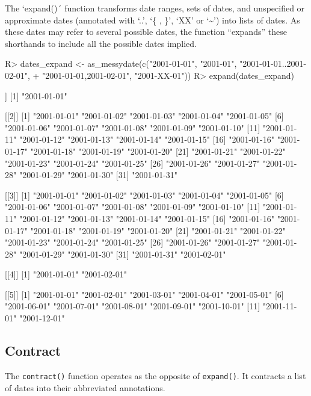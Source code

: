 \documentclass[
]{jss}
\begin{document}
The `expand()´ function transforms date ranges, sets of dates, and
unspecified or approximate dates (annotated with `..', `\{ , \}', `XX'
or `\textasciitilde{}') into lists of dates. As these dates may refer to
several possible dates, the function ``expands'' these shorthands to
include all the possible dates implied.

\begin{CodeChunk}
\begin{CodeInput}
R> dates_expand <- as_messydate(c("2001-01-01", "2001-01", "2001-01-01..2001-02-01",
+                                "{2001-01-01,2001-02-01}", "2001-XX-01"))
R> expand(dates_expand)
\end{CodeInput}
\begin{CodeOutput}
[[1]]
[1] "2001-01-01"

[[2]]
 [1] "2001-01-01" "2001-01-02" "2001-01-03" "2001-01-04" "2001-01-05"
 [6] "2001-01-06" "2001-01-07" "2001-01-08" "2001-01-09" "2001-01-10"
[11] "2001-01-11" "2001-01-12" "2001-01-13" "2001-01-14" "2001-01-15"
[16] "2001-01-16" "2001-01-17" "2001-01-18" "2001-01-19" "2001-01-20"
[21] "2001-01-21" "2001-01-22" "2001-01-23" "2001-01-24" "2001-01-25"
[26] "2001-01-26" "2001-01-27" "2001-01-28" "2001-01-29" "2001-01-30"
[31] "2001-01-31"

[[3]]
 [1] "2001-01-01" "2001-01-02" "2001-01-03" "2001-01-04" "2001-01-05"
 [6] "2001-01-06" "2001-01-07" "2001-01-08" "2001-01-09" "2001-01-10"
[11] "2001-01-11" "2001-01-12" "2001-01-13" "2001-01-14" "2001-01-15"
[16] "2001-01-16" "2001-01-17" "2001-01-18" "2001-01-19" "2001-01-20"
[21] "2001-01-21" "2001-01-22" "2001-01-23" "2001-01-24" "2001-01-25"
[26] "2001-01-26" "2001-01-27" "2001-01-28" "2001-01-29" "2001-01-30"
[31] "2001-01-31" "2001-02-01"

[[4]]
[1] "2001-01-01" "2001-02-01"

[[5]]
 [1] "2001-01-01" "2001-02-01" "2001-03-01" "2001-04-01" "2001-05-01"
 [6] "2001-06-01" "2001-07-01" "2001-08-01" "2001-09-01" "2001-10-01"
[11] "2001-11-01" "2001-12-01"
\end{CodeOutput}
\end{CodeChunk}

\hypertarget{contract}{%
\subsection{Contract}\label{contract}}

The \texttt{contract()} function operates as the opposite of
\texttt{expand()}. It contracts a list of dates into their abbreviated
annotations.
\end{document}
